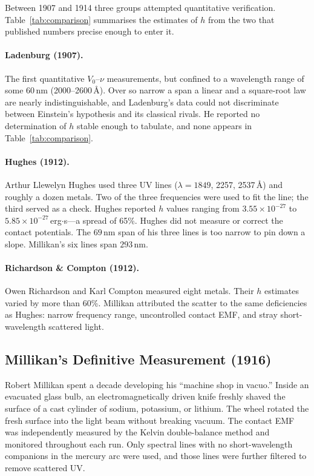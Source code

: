 \documentclass[12pt]{article}
\begin{document}
Between 1907 and 1914 three groups attempted quantitative verification.
Table~\ref{tab:comparison} summarises the estimates of $h$ from the two that
published numbers precise enough to enter it.

\paragraph{Ladenburg (1907).}  The first quantitative $V_0$--$\nu$
measurements, but confined to a wavelength range of some $60$\,nm
(2000--2600\,\AA).  Over so narrow a span a linear and a square-root law are
nearly indistinguishable, and Ladenburg's data could not discriminate between
Einstein's hypothesis and its classical rivals.  He reported no determination
of $h$ stable enough to tabulate, and none appears in
Table~\ref{tab:comparison}.

\paragraph{Hughes (1912).}  Arthur Llewelyn Hughes \citep{Hughes1913} used
three UV lines ($\lambda = 1849$, 2257, 2537\,\AA) and roughly a dozen metals.
Two of the three frequencies were used to fit the line; the third served as a
check.  Hughes reported $h$ values ranging from $3.55\times10^{-27}$ to
$5.85\times10^{-27}$\,erg$\cdot$s---a spread of 65\%.  Hughes did not measure
or correct the contact potentials.  The $69$\,nm span of his three lines is
too narrow to pin down a slope.  Millikan's six lines span $293$\,nm.

\paragraph{Richardson \& Compton (1912).}  Owen Richardson and Karl Compton
\citep{RichardsonCompton1912} measured eight metals.  Their $h$ estimates
varied by more than 60\%.  Millikan \citeyearpar{Millikan1916} attributed
the scatter to the same deficiencies as Hughes: narrow frequency range,
uncontrolled contact EMF, and stray short-wavelength scattered light.

\subsection{Millikan's Definitive Measurement (1916)}

Robert Millikan spent a decade developing his ``machine shop in vacuo.''
Inside an evacuated glass bulb, an electromagnetically driven knife freshly
shaved the surface of a cast cylinder of sodium, potassium, or lithium.
The wheel rotated the fresh surface into the light beam without breaking vacuum.
The contact EMF was independently measured by the Kelvin double-balance
method and monitored throughout each run.  Only spectral lines with no
short-wavelength companions in the mercury arc were used, and those lines were
further filtered to remove scattered UV.
\end{document}
